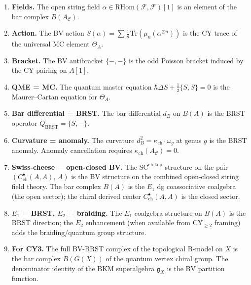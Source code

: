 \documentclass[11pt]{amsart}
\theoremstyle{plain}
\theoremstyle{definition}
\theoremstyle{remark}
\newcommand{\Tr}{\mathrm{Tr}}
\newcommand{\RHom}{\mathrm{RHom}}
\newcommand{\BRST}{\mathrm{BRST}}
\newcommand{\SC}{\mathrm{SC}}
\newcommand{\cC}{\mathcal{C}}
\newcommand{\cF}{\mathcal{F}}
\begin{document}
\begin{enumerate}[label=(\arabic*)]
 \item \textbf{Fields.} The open string field $\alpha \in \RHom(\cF,\cF)[1]$ is an element of the bar complex $B(A_\cC)$.

 \item \textbf{Action.} The BV action $S(\alpha) = \sum \frac{1}{n}\Tr(\mu_n(\alpha^{\otimes n}))$ is the CY trace of the universal MC element $\Theta_A$.

 \item \textbf{Bracket.} The BV antibracket $\{-,-\}$ is the odd Poisson bracket induced by the CY pairing on $A[1]$.

 \item \textbf{QME = MC.} The quantum master equation $\hbar\Delta S + \frac{1}{2}\{S,S\} = 0$ is the Maurer--Cartan equation for $\Theta_A$.

 \item \textbf{Bar differential = BRST.} The bar differential $d_B$ on $B(A)$ is the BRST operator $Q_{\BRST} = \{S,-\}$.

 \item \textbf{Curvature = anomaly.} The curvature $d_B^2 = \kappa_{\mathrm{ch}} \cdot \omega_g$ at genus $g$ is the BRST anomaly. Anomaly cancellation requires $\kappa_{\mathrm{ch}}(A_\cC) = 0$.

 \item \textbf{Swiss-cheese = open-closed BV.} The $\SC^{\mathrm{ch,top}}$ structure on the pair $(C^\bullet_{\mathrm{ch}}(A,A),\, A)$ is the BV structure on the combined open-closed string field theory. The bar complex $B(A)$ is the $E_1$ dg coassociative coalgebra (the open sector); the chiral derived center $C^\bullet_{\mathrm{ch}}(A,A)$ is the closed sector.

 \item \textbf{$E_1$ = BRST, $E_2$ = braiding.} The $E_1$ coalgebra structure on $B(A)$ is the BRST direction; the $E_2$ enhancement (when available from CY$_{\geq 2}$ framing) adds the braiding/quantum group structure.

 \item \textbf{For CY3.} The full BV-BRST complex of the topological B-model on $X$ is the bar complex $B(G(X))$ of the quantum vertex chiral group. The denominator identity of the BKM superalgebra $\mathfrak{g}_X$ is the BV partition function.
\end{enumerate}

\end{document}
